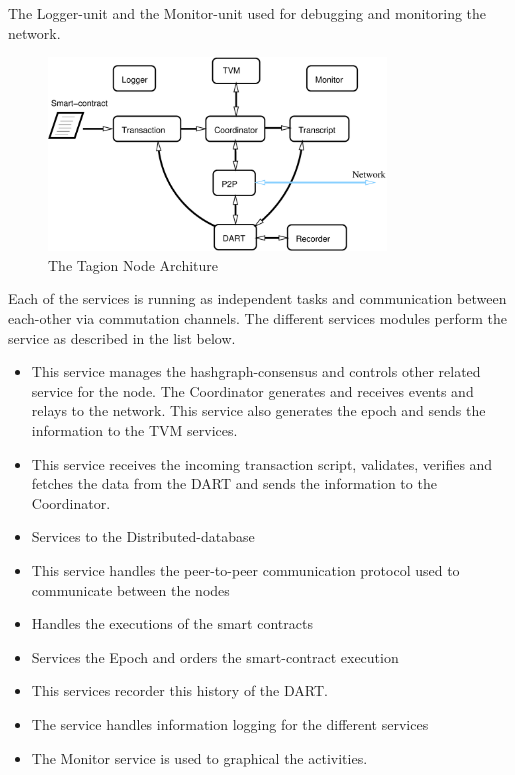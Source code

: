 The Logger-unit and the Monitor-unit used for debugging and monitoring the network.

\begin{figure}[H]
	\centering
	\includegraphics[width=0.8\textwidth]{fig/node_service.eps}
	\caption{The Tagion Node Architure}
	\label{fig:node_service}
\end{figure}


Each of the services is running as independent tasks and communication between each-other via commutation channels. The different services modules perform the service as described in the list below.

\begin{itemize}
	\item[\bfit{Coordinator}] This service manages the hashgraph-consensus and controls other related service for the node. 
	The Coordinator generates and receives events and relays to the network. This service also generates the epoch and sends the information to the TVM services.
	\item[\bfit{Transaction}] This service receives the incoming transaction script, validates, verifies and fetches the data from the DART and sends the information to the Coordinator.
	\item[\bfit{DART}] Services to the Distributed-database
	\item[\bfit{P2P}] This service handles the peer-to-peer communication protocol used to communicate between the nodes
	\item[\bfit{TVM}] Handles the executions of the smart contracts
	\item[\bfit{Transcript}] Services the Epoch and orders the smart-contract execution
	\item[\bfit{Recorder}] This services recorder this history of the DART.
	\item[\bfit{Logger}] The service handles information logging for the different services
	\item[\bfit{Monitor}] The Monitor service is used to graphical the activities.
\end{itemize}


